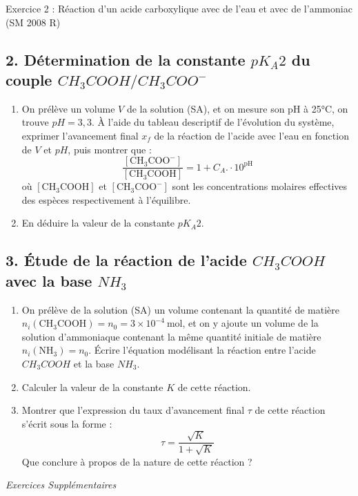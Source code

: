 \documentclass[12pt, french]{article}
\begin{document}
\begin{Box2}{Exercice 2 :  Réaction d’un acide carboxylique avec de l’eau et avec de l’ammoniac (SM 2008 R)}
\subsection*{2. Détermination de la constante $pK_A2$ du couple $CH_3COOH/CH_3COO^-$}
\begin{enumerate}
    \item On prélève un volume $V$ de la solution (SA), et on mesure son pH à 25°C, on trouve $pH = 3,3$.  
    À l’aide du tableau descriptif de l’évolution du système, exprimer l’avancement final $x_f$ de la réaction de l’acide avec l’eau en fonction de $V$ et $pH$, puis montrer que :  
    \[
    \frac{[\text{CH}_3\text{COO}^-]}{[\text{CH}_3\text{COOH}]} = 1+ C_A.\cdot 10^{\text{pH}}
    \]
    où $[\text{CH}_3\text{COOH}]$ et $[\text{CH}_3\text{COO}^-]$ sont les concentrations molaires effectives des espèces respectivement à l’équilibre.
    \item En déduire la valeur de la constante $pK_A2$.
\end{enumerate}

\subsection*{3. Étude de la réaction de l’acide $CH_3COOH$ avec la base $NH_3$}
\begin{enumerate}
    \item On prélève de la solution (SA) un volume contenant la quantité de matière $n_i(\text{CH}_3\text{COOH}) = n_0 = 3 \times 10^{-4}\ \text{mol}$, et on y ajoute un volume de la solution d’ammoniaque contenant la même quantité initiale de matière $n_i(\text{NH}_3) = n_0$.  
    Écrire l’équation modélisant la réaction entre l’acide $CH_3COOH$ et la base $NH_3$.
    \item Calculer la valeur de la constante $K$ de cette réaction.
    \item Montrer que l’expression du taux d’avancement final $\tau$ de cette réaction s’écrit sous la forme :  
    \[
      \tau = \frac{\sqrt{K}}{1 + \sqrt{K}}
    \]
    Que conclure à propos de la nature de cette réaction ?
\end{enumerate}


\end{Box2}

\vspace{-0.8cm}
\begin{center}
   \Large{ \em{Exercices Supplémentaires}}
\end{center}
\end{document}
